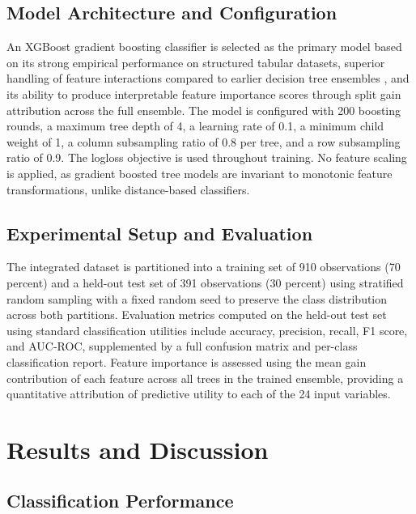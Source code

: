 \documentclass[conference]{IEEEtran}
\begin{document}
\subsection{Model Architecture and Configuration}

An XGBoost gradient boosting classifier \cite{chen2016xgboost} is selected as the primary model based on its strong empirical performance on structured tabular datasets, superior handling of feature interactions compared to earlier decision tree ensembles \cite{breiman2001random}, and its ability to produce interpretable feature importance scores through split gain attribution across the full ensemble. The model is configured with 200 boosting rounds, a maximum tree depth of 4, a learning rate of 0.1, a minimum child weight of 1, a column subsampling ratio of 0.8 per tree, and a row subsampling ratio of 0.9. The logloss objective is used throughout training. No feature scaling is applied, as gradient boosted tree models are invariant to monotonic feature transformations, unlike distance-based classifiers.

\subsection{Experimental Setup and Evaluation}

The integrated dataset is partitioned into a training set of 910 observations (70 percent) and a held-out test set of 391 observations (30 percent) using stratified random sampling with a fixed random seed to preserve the class distribution across both partitions. Evaluation metrics computed on the held-out test set using standard classification utilities \cite{pedregosa2011scikit} include accuracy, precision, recall, F1 score, and AUC-ROC, supplemented by a full confusion matrix and per-class classification report. Feature importance is assessed using the mean gain contribution of each feature across all trees in the trained ensemble, providing a quantitative attribution of predictive utility to each of the 24 input variables.

\section{Results and Discussion}

\subsection{Classification Performance}
\end{document}

